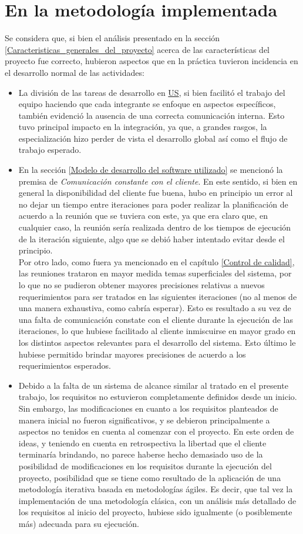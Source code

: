 \documentclass[a4paper, 12pt,twoside]{report}  %
\numberwithin{equation}{subsection} %
\begin{document}
\section{En la metodología implementada}
\label{comparacion_metodologia_implementada}
Se considera que, si bien el análisis presentado en la sección \ref{Caracteristicas_generales_del_proyecto} acerca de las características del proyecto fue correcto, hubieron aspectos que en la práctica tuvieron incidencia en el desarrollo normal de las actividades:
\begin{itemize}
	\item La división de las tareas de desarrollo en \hyperlink{US}{US}, si bien facilitó el trabajo del equipo haciendo que cada integrante se enfoque en aspectos específicos, también evidenció la ausencia de una correcta comunicación interna. Esto tuvo principal impacto en la integración, ya que, a grandes rasgos, la especialización hizo perder de vista el desarrollo global así como el flujo de trabajo esperado.
	\item En la sección \ref{Modelo de desarrollo del software utilizado} se mencionó la premisa de \textit{Comunicación constante con el cliente}. En este sentido, si bien en general la disponibilidad del cliente fue buena, hubo en principio un error al no dejar un tiempo entre iteraciones para poder realizar la planificación de acuerdo a la reunión que se tuviera con este, ya que era claro que, en cualquier caso, la reunión sería realizada dentro de los tiempos de ejecución de la iteración siguiente, algo que se debió haber intentado evitar desde el principio.\\
	Por otro lado, como fuera ya mencionado en el capítulo \ref{Control de calidad}, las reuniones trataron en mayor medida temas superficiales del sistema, por lo que no se pudieron obtener mayores precisiones relativas a nuevos requerimientos para ser tratados en las siguientes iteraciones (no al menos de una manera exhaustiva, como cabría esperar). Esto es resultado a su vez de una falta de comunicación constate con el cliente durante la ejecución de las iteraciones, lo que hubiese facilitado al cliente inmiscuirse en mayor grado en los distintos aspectos relevantes para el desarrollo del sistema. Esto último le hubiese permitido brindar mayores precisiones de acuerdo a los requerimientos esperados.
	\item Debido a la falta de un sistema de alcance similar al tratado en el presente trabajo, los requisitos no estuvieron completamente definidos desde un inicio. Sin embargo, las modificaciones en cuanto a los requisitos planteados de manera inicial no fueron significativos, y se debieron principalmente a aspectos no tenidos en cuenta al comenzar con el proyecto. En este orden de ideas, y teniendo en cuenta en retrospectiva la libertad que el cliente terminaría brindando, no parece haberse hecho demasiado uso de la posibilidad de modificaciones en los requisitos durante la ejecución del proyecto, posibilidad que se tiene como resultado de la aplicación de una metodología iterativa basada en metodologías ágiles. Es decir, que tal vez la implementación de una metodología clásica, con un análisis más detallado de los requisitos al inicio del proyecto, hubiese sido igualmente (o posiblemente más) adecuada para su ejecución.

\end{itemize}
\end{document}
